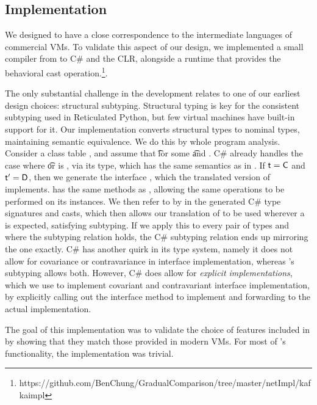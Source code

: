 \documentclass[a4paper,USenglish]{tex/lipics-v2016}
\begin{document}
\subsection{Implementation}

We designed \kafka to have a close correspondence to the intermediate
languages of commercial VMs. To validate this aspect of our design, we
implemented a small compiler from \kafka to C\# and the CLR, alongside a
runtime that provides the behavioral cast
operation.\footnote{https://github.com/BenChung/GradualComparison/tree/master/netImpl/kafkaimpl}.

The only substantial challenge in the development relates to one of our
earliest design choices: structural subtyping.  Structural typing is key for
the consistent subtyping used in Reticulated Python, but few virtual
machines have built-in support for it. Our implementation converts
structural types to nominal types, maintaining semantic equivalence.  We do
this by whole program analysis. Consider a class table \K, and assume that
\StrSub{}\K\t\tp for some \t and \tp. C\# already handles the case where \t
or \tp is \any, via its  type, which has the same semantics as
\any in \kafka. If $\t=\C$ and $\tp=\D$, then we generate the interface
, which the translated version of \C implements.  has the same
methods as \D, allowing the same operations to be performed on its
instances. We then refer to \D by  in the generated C\# type
signatures and casts, which then allows our translation of \C to be used
wherever a \D is expected, satisfying subtyping. If we apply this to every
pair of types \C and \D where the subtyping relation holds, the C\#
subtyping relation ends up mirroring the \kafka one exactly.  C\# has
another quirk in its type system, namely it does not allow for covariance or
contravariance in interface implementation, whereas \kafka's subtyping
allows both. However, C\# does allow for \emph{explicit implementations},
which we use to implement covariant and contravariant interface
implementation, by explicitly calling out the interface method to implement
and forwarding to the actual implementation.

The goal of this implementation was to validate the choice of features
included in \kafka by showing that they match those provided in modern VMs.
For most of \kafka's functionality, the implementation was trivial. 

\end{document}
